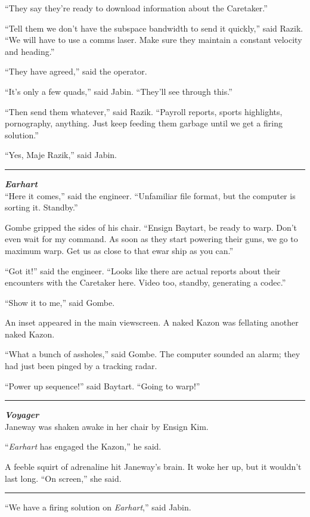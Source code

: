 \documentclass[twoside,letterpaper,12pt]{memoir}
\begin{document}
``They say they're ready to download information about the Caretaker.''

``Tell them we don't have the subspace bandwidth to send it quickly,'' said Razik. ``We will have to use a comms laser. Make sure they maintain a constant velocity and heading.''

``They have agreed,'' said the operator.

``It's only a few quads,'' said Jabin. ``They'll see through this.''

``Then send them whatever,'' said Razik. ``Payroll reports, sports highlights, pornography, anything. Just keep feeding them garbage until we get a firing solution.''

``Yes, Maje Razik,'' said Jabin.

\fancybreak{\rule{3cm}{0.4 pt}}
\noindent\textit{\textbf{Earhart}}\\

``Here it comes,'' said the engineer. ``Unfamiliar file format, but the computer is sorting it. Standby.''

Gombe gripped the sides of his chair. ``Ensign Baytart, be ready to warp. Don't even wait for my command. As soon as they start powering their guns, we go to maximum warp. Get us as close to that ewar ship as you can.''

``Got it!'' said the engineer. ``Looks like there are actual reports about their encounters with the Caretaker here. Video too, standby, generating a codec.''

``Show it to me,'' said Gombe.

An inset appeared in the main viewscreen. A naked Kazon was fellating another naked Kazon.

``What a bunch of assholes,'' said Gombe. The computer sounded an alarm; they had just been pinged by a tracking radar.

``Power up sequence!'' said Baytart. ``Going to warp!''

\fancybreak{\rule{3cm}{0.4 pt}}
\noindent\textit{\textbf{Voyager}}\\

Janeway was shaken awake in her chair by Ensign Kim.

``\textit{Earhart} has engaged the Kazon,'' he said.

A feeble squirt of adrenaline hit Janeway's brain. It woke her up, but it wouldn't last long. ``On screen,'' she said.

\fancybreak{\rule{3cm}{0.4 pt}}
``We have a firing solution on \textit{Earhart},'' said Jabin.
\end{document}
